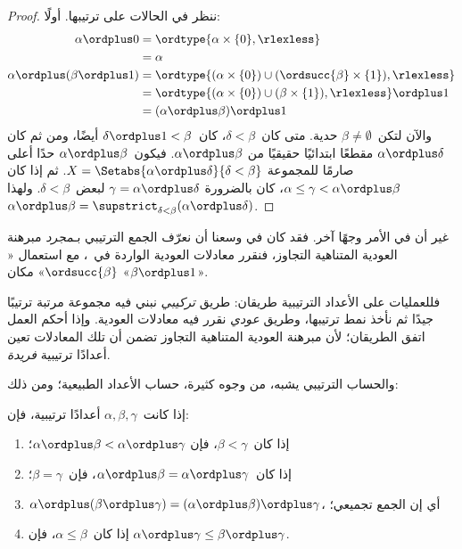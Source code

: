 \documentclass[../../../include/open-logic-section]{subfiles}
\begin{document}
\begin{proof}
ننظر في الحالات على ترتيبها. أولًا:
\begin{align*}
	\alpha \ordplus  0
	&= \ordtype{\alpha \times \{0\}, \rlexless}\\
	&= \alpha\\
	\alpha \ordplus (\beta \ordplus  1)
	&= \ordtype{(\alpha\times \{0\}) \cup (\ordsucc{\beta}\times \{1\}), \rlexless} \\
	&= \ordtype{(\alpha\times \{0\}) \cup (\beta \times \{1\}), \rlexless} \ordplus 1\\
	&= (\alpha \ordplus  \beta) \ordplus  1
\end{align*}
والآن لتكن~$\beta \neq \emptyset$ حدية. متى كان~$\delta < \beta$،
كان~$\delta\ordplus 1 < \beta$ أيضًا، ومن ثم كان
$\alpha \ordplus \delta$ مقطعًا ابتدائيًا حقيقيًا من
$\alpha \ordplus \beta$. فيكون~$\alpha \ordplus \beta$ حدًا أعلى
صارمًا للمجموعة
$X = \Setabs{\alpha \ordplus \delta}{\delta < \beta}$. ثم إذا كان
$\alpha \leq \gamma < \alpha \ordplus \beta$، كان بالضرورة
$\gamma = \alpha \ordplus \delta$ لبعض~$\delta < \beta$. ولهذا
$\alpha \ordplus \beta =
\supstrict_{\delta< \beta}(\alpha\ordplus \delta)$.
\end{proof}

غير أن في الأمر وجهًا آخر. فقد كان في وسعنا أن نعرّف الجمع الترتيبي
بـ\emph{مجرد} مبرهنة العودية المتناهية التجاوز، فنقرر معادلات
العودية الواردة في~، مع استعمال
«$\ordsucc{\beta}$» مكان «$\beta \ordplus 1$».

فللعمليات على الأعداد الترتيبية طريقان: طريق \emph{تركيبي} نبني فيه
مجموعة مرتبة ترتيبًا جيدًا ثم نأخذ نمط ترتيبها، وطريق \emph{عودي}
نقرر فيه معادلات العودية. وإذا أحكم العمل اتفق الطريقان؛ لأن مبرهنة
العودية المتناهية التجاوز تضمن أن تلك المعادلات تعين أعدادًا ترتيبية
\emph{فريدة}.

والحساب الترتيبي يشبه، من وجوه كثيرة، حساب الأعداد الطبيعية؛ ومن ذلك:

\begin{lem}
إذا كانت~$\alpha, \beta, \gamma$ أعدادًا ترتيبية، فإن:
\begin{enumerate}
	\item{} إذا كان~$\beta < \gamma$، فإن
	$\alpha \ordplus \beta < \alpha \ordplus \gamma$؛
	\item{} إذا كان~$\alpha \ordplus \beta =
	\alpha\ordplus \gamma$، فإن~$\beta = \gamma$؛
	\item{} $\alpha \ordplus (\beta \ordplus
	\gamma) = (\alpha \ordplus \beta) \ordplus \gamma$، أي إن الجمع
	تجميعي؛
	\item{} إذا كان~$\alpha \leq \beta$، فإن
	$\alpha \ordplus \gamma \leq \beta \ordplus \gamma$.
\end{enumerate}
\end{lem}
\end{document}
